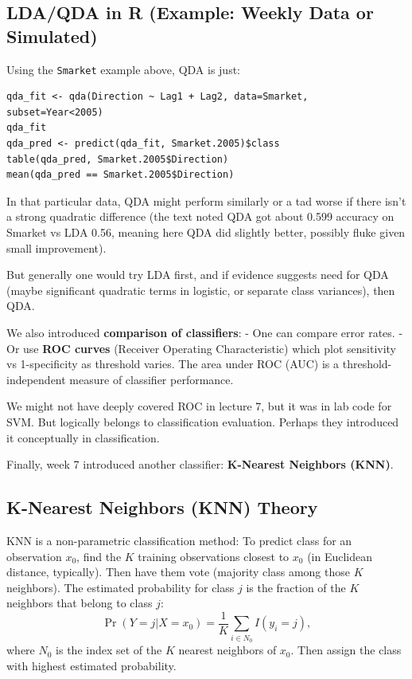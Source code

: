 \documentclass[11pt]{article}
\begin{document}
\subsection{LDA/QDA in R (Example: Weekly Data or Simulated)}
Using the \texttt{Smarket} example above, QDA is just:
\begin{verbatim}
qda_fit <- qda(Direction ~ Lag1 + Lag2, data=Smarket, subset=Year<2005)
qda_fit
qda_pred <- predict(qda_fit, Smarket.2005)$class
table(qda_pred, Smarket.2005$Direction)
mean(qda_pred == Smarket.2005$Direction)
\end{verbatim}
In that particular data, QDA might perform similarly or a tad worse if there isn’t a strong quadratic difference (the text noted QDA got about 0.599 accuracy on Smarket vs LDA 0.56, meaning here QDA did slightly better, possibly fluke given small improvement).

But generally one would try LDA first, and if evidence suggests need for QDA (maybe significant quadratic terms in logistic, or separate class variances), then QDA.

We also introduced \textbf{comparison of classifiers}:
- One can compare error rates.
- Or use \textbf{ROC curves} (Receiver Operating Characteristic) which plot sensitivity vs 1-specificity as threshold varies. The area under ROC (AUC) is a threshold-independent measure of classifier performance.

We might not have deeply covered ROC in lecture 7, but it was in lab code for SVM. But logically belongs to classification evaluation. Perhaps they introduced it conceptually in classification.

Finally, week 7 introduced another classifier: \textbf{K-Nearest Neighbors (KNN)}.

\subsection{K-Nearest Neighbors (KNN) Theory}
KNN is a non-parametric classification method:
To predict class for an observation $x_0$, find the $K$ training observations closest to $x_0$ (in Euclidean distance, typically). Then have them vote (majority class among those $K$ neighbors). The estimated probability for class $j$ is the fraction of the $K$ neighbors that belong to class $j$:
\[ \Pr(Y=j|X=x_0) = \frac{1}{K} \sum_{i \in N_0} I(y_i = j), \] 
where $N_0$ is the index set of the $K$ nearest neighbors of $x_0$. Then assign the class with highest estimated probability.
\end{document}
